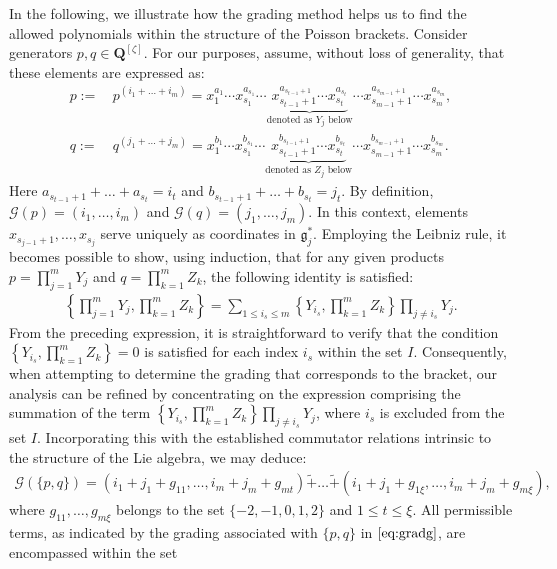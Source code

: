 \documentclass[10pt]{amsart}
\theoremstyle{definition}
\theoremstyle{corollary}
\theoremstyle{remark}
\theoremstyle{conclusion}
\begin{document}
In the following, we illustrate how the grading method helps us to find the allowed polynomials within the structure of the Poisson brackets. Consider generators $p, q \in \boldsymbol{Q}^{[\zeta]}$. For our purposes, assume, without loss of generality, that these elements are expressed as: 
\begin{align*}
p := & \, p^{(i_1 + \ldots + i_m)} = x_1^{a_1} \cdots x_{s_1}^{a_{s_1}} \cdots \underbrace{x_{{s_{t-1}}+1}^{a_{s_{t-1}+1}} \cdots x_{s_t}^{a_{s_t}}}_{\text{denoted as $Y_j$ below}} \cdots x_{s_{m-1}+1}^{a_{s_{m-1}+1}} \cdots x_{s_m}^{a_{s_m}}, \\
q := & \, q^{(j_1 + \ldots + j_m)} = x_1^{b_1} \cdots x_{s_1}^{b_{s_1}} \cdots \underbrace{x_{{s_{t-1}}+1}^{b_{s_{t-1}+1}} \cdots x_{s_t}^{b_{s_t}}}_{\text{denoted as $Z_j$ below}} \cdots x_{s_{m-1}+1}^{b_{s_{m-1}+1}} \cdots x_{s_m}^{b_{s_m}}.
\end{align*} Here $a_{s_{t-1} + 1} + \ldots + a_{s_t} = i_t$ and $b_{s_{t-1}+1} + \ldots +b_{ s_t} =  j_t. $
By definition, $\mathcal{G}(p) = (i_1, \ldots, i_m)$ and $\mathcal{G}(q) = (j_1, \ldots, j_m)$. In this context, elements $x_{s_{j-1}+1}, \ldots, x_{s_j}$ serve uniquely as coordinates in $\mathfrak{g}_j^*$. Employing the Leibniz rule, it becomes possible to show, using induction, that for any given products $ p = \prod_{j=1}^m Y_j $ and $ q = \prod_{k=1}^m Z_k$, the following identity is satisfied:
\begin{align} 
     \left\{\prod_{j=1}^m Y_j,\prod_{k=1}^m  Z_k\right\}   = \sum_{1 \leq i_s \leq m} \left\{Y_{i_s},\prod_{k=1}^m  Z_k\right\} \prod_{j \neq i_s} Y_j. \label{eq:muli} %
 \end{align} 
  From the preceding expression, it is straightforward to verify that the condition $\left\{Y_{i_s},\prod_{k=1}^m Z_k\right\} = 0$ is satisfied for each index $i_s$ within the set $I.$ Consequently, when attempting to determine the grading that corresponds to the bracket, our analysis can be refined by concentrating on the expression comprising the summation of the term $\left\{Y_{i_s},\prod_{k=1}^m Z_k\right\} \prod_{j \neq i_s} Y_j $, where $i_s$ is excluded from the set $I.$ Incorporating this with the established commutator relations intrinsic to the structure of the Lie algebra, we may deduce:
\begin{align}
    \mathcal{G} \left(\{p,q\}\right) = \left(i_1 + j_1 + g_{11}, \ldots, i_m + j_m + g_{mt}\right) \tilde{+} \ldots \tilde{+} \left(i_1 + j_1 + g_{1 \xi}, \ldots, i_m + j_m + g_{m \xi}\right), \label{eq:gradg}
\end{align} where $g_{11}, \ldots, g_{m \xi}$ belongs to the set $\{-2, -1, 0, 1, 2\}$ and $1 \leq t \leq \xi.$ All permissible terms, as indicated by the grading associated with $\{p,q\}$ in $\eqref{eq:gradg}$, are encompassed within the set
\end{document}

